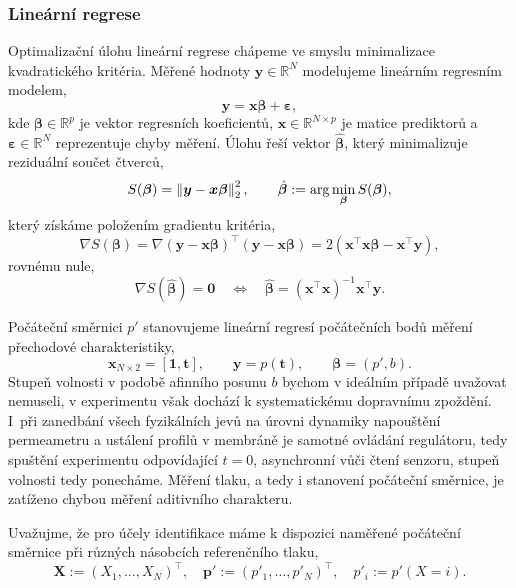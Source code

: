 \subsubsection{Lineární regrese}\label{sss:linearni_regrese}
Optimalizační úlohu lineární regrese chápeme ve smyslu minimalizace kvadratického kritéria. Měřené hodnoty $\bm{y}\in\mathbb{R}^N$ modelujeme lineárním regresním modelem,
\begin{equation}
    \bm{y}=\bm{x}\bm{\beta}+\bm{\varepsilon},
\end{equation}
kde ${\bm{\beta}\in\mathbb{R}^p}$ je vektor regresních koeficientů, ${\bm{x}\in\mathbb{R}^{N\times p}}$ je matice prediktorů  a ${\bm{\varepsilon}\in\mathbb{R}^N}$ reprezentuje chyby měření. Úlohu řeší vektor $\hat{\bm{\beta}}$, který minimalizuje reziduální součet čtverců, 
\begin{equation}
    S(\bm{\beta})=\left\lVert\bm{y}-\bm{x}\bm{\beta}\right\rVert_2^2,\qquad \hat{\bm{\beta}}:=\arg \min_{\bm{\beta}} S(\bm{\beta}),
\end{equation}
který získáme položením gradientu kritéria,
\begin{equation}
    \nabla S(\bm{\beta})=\nabla(\bm{y}-\bm{x}\bm{\beta})^\top(\bm{y}-\bm{x}\bm{\beta})=2(\bm{x}^\top\bm{x}\bm{\beta}-\bm{x}^\top\bm{y}),
\end{equation}
rovnému nule,
\begin{equation}\label{eq:linear_regression_solution}
    \nabla S(\hat{\bm{\beta}})= \bm{0} \quad \Longleftrightarrow \quad \hat{\bm{\beta}}=(\bm{x}^\top\bm{x})^{-1}\bm{x}^\top\bm{y}.
\end{equation}

Počáteční směrnici $p'$ stanovujeme lineární regresí počátečních bodů měření přechodové charakteristiky,
\begin{equation}
    \bm{x}_{N\times 2}=[\bm{1}, \bm{t}], \qquad \bm{y}=p(\bm{t}),\qquad  \bm{\beta}=(p',b).
\end{equation}
Stupeň volnosti v podobě afinního posunu $b$ bychom v ideálním případě uvažovat nemuseli, v experimentu však dochází k systematickému dopravnímu zpoždění. I~při zanedbání všech fyzikálních jevů na úrovni dynamiky napouštění permeametru a ustálení profilů v membráně je samotné ovládání regulátoru, tedy spuštění experimentu odpovídající $t=0$, asynchronní vůči čtení senzoru, stupeň volnosti tedy ponecháme. Měření tlaku, a tedy i stanovení počáteční směrnice, je zatíženo chybou měření aditivního charakteru. 

Uvažujme, že pro účely identifikace máme k dispozici naměřené počáteční směrnice při různých násobcích referenčního tlaku,
\begin{equation}
    \bm{X}:=(X_1,\dots, X_N)^\top,\quad \bm{p'}:=(p'_{1},\dots,p'_N)^\top,\quad p'_i:=p'(X=i).
\end{equation}

